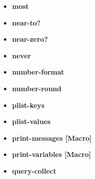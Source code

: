 \documentclass [11pt]{book}
\begin{document}
\begin{itemize}
\item {}
\label{prim:most}
\textbf{most}





\item {}
\label{prim:near-to?}
\textbf{near-to?}





\item {}
\label{prim:near-zero?}
\textbf{near-zero?}





\item {}
\label{prim:never}
\textbf{never}





\item {}
\label{prim:number-format}
\textbf{number-format}





\item {}
\label{prim:number-round}
\textbf{number-round}





\item {}
\label{prim:plist-keys}
\textbf{plist-keys}





\item {}
\label{prim:plist-values}
\textbf{plist-values}





\item {}
\label{prim:print-messages}
\textbf{print-messages [Macro]}





\item {}
\label{prim:print-variables}
\textbf{print-variables [Macro]}





\item {}
\label{prim:query-collect}
\textbf{query-collect}






\end{itemize}
\end{document}
